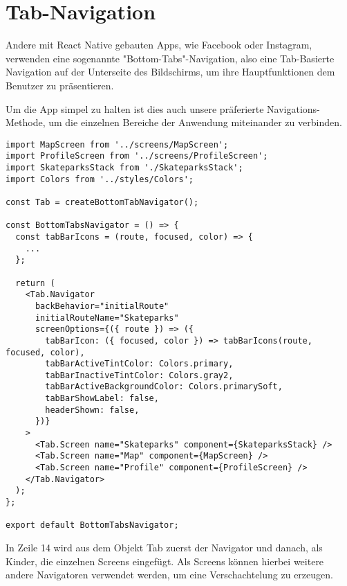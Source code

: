 \section{Tab-Navigation}
Andere mit React Native gebauten Apps, wie Facebook oder Instagram, verwenden eine sogenannte
"Bottom-Tabs"{}-Navigation, also eine Tab-Basierte Navigation auf der Unterseite des Bildschirms, um
ihre Hauptfunktionen dem Benutzer zu präsentieren.

Um die App simpel zu halten ist dies auch unsere präferierte Navigations-Methode, um die einzelnen
Bereiche der Anwendung miteinander zu verbinden.

\begin{lstlisting}
import MapScreen from '../screens/MapScreen';
import ProfileScreen from '../screens/ProfileScreen';
import SkateparksStack from './SkateparksStack';
import Colors from '../styles/Colors';

const Tab = createBottomTabNavigator();

const BottomTabsNavigator = () => {
  const tabBarIcons = (route, focused, color) => {
    ...
  };

  return (
    <Tab.Navigator
      backBehavior="initialRoute"
      initialRouteName="Skateparks"
      screenOptions={({ route }) => ({
        tabBarIcon: ({ focused, color }) => tabBarIcons(route, focused, color),
        tabBarActiveTintColor: Colors.primary,
        tabBarInactiveTintColor: Colors.gray2,
        tabBarActiveBackgroundColor: Colors.primarySoft,
        tabBarShowLabel: false,
        headerShown: false,
      })}
    >
      <Tab.Screen name="Skateparks" component={SkateparksStack} />
      <Tab.Screen name="Map" component={MapScreen} />
      <Tab.Screen name="Profile" component={ProfileScreen} />
    </Tab.Navigator>
  );
};

export default BottomTabsNavigator;
\end{lstlisting}

In Zeile 14 wird aus dem Objekt Tab zuerst der Navigator und danach, als Kinder, die einzelnen
Screens eingefügt. Als Screens können hierbei weitere andere Navigatoren verwendet werden, um eine
Verschachtelung zu erzeugen.

\newpage


\newpage
